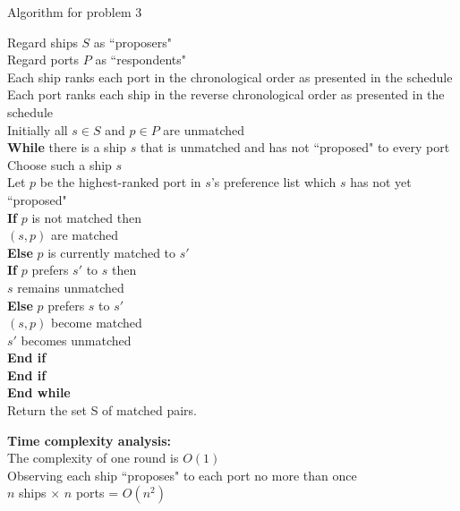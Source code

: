 \documentclass[12pt]{article}
\begin{document}
\begin{algorithm}[H]
\caption{Algorithm for problem 3}
Regard ships $S$ as ``proposers" \\
Regard ports $P$ as ``respondents"\\
Each ship ranks each port in the chronological order as presented in the schedule\\
Each port ranks each ship in the reverse chronological order as presented in the schedule\\
Initially all $s\in S$ and $p\in P$ are unmatched\\
\textbf{While} there is a ship $s$ that is unmatched and has not ``proposed" to every port\\
\hspace*{10mm}Choose such a ship $s$\\
\hspace*{10mm}Let $p$ be the highest-ranked port in $s$'s preference list which $s$ has not yet ``proposed"\\
\hspace*{10mm}\textbf{If} $p$ is not matched then\\
\hspace*{20mm}$(s,p)$ are matched\\
\hspace*{10mm}\textbf{Else} $p$ is currently matched to $s'$\\
\hspace*{20mm}\textbf{If} $p$ prefers $s'$ to $s$ then\\
\hspace*{30mm}$s$ remains unmatched\\
\hspace*{20mm}\textbf{Else} $p$ prefers $s$ to $s'$\\
\hspace*{30mm}$(s,p)$ become matched\\
\hspace*{30mm}$s'$ becomes unmatched\\
\hspace*{20mm}\textbf{End if}\\
\hspace*{10mm}\textbf{End if}\\
\textbf{End while}\\
Return the set S of matched pairs.
\end{algorithm}
\textbf{Time complexity analysis:}\\
The complexity of one round is $O(1)$\\
Observing each ship ``proposes" to each port no more than once\\
$n$ ships $\times$ $n$ ports = $O(n^2)$
\end{document}

